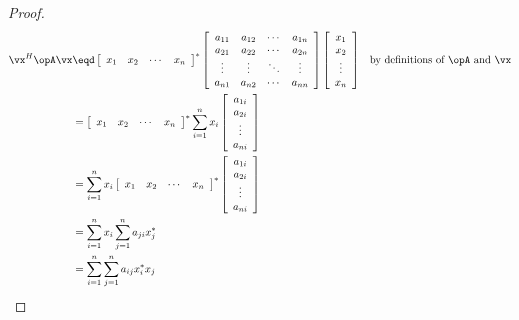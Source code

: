 \begin{lemma}
\label{lem:xAx}
\end{lemma}

\begin{proof}
\begin{align*}
   \vx ^H \opA \vx 
   &\eqd
   \left[ \begin{array}{ccccc} x_1 & x_2 & \cdots & x_n \end{array} \right]^\ast
   \left[\begin{array}{ccccc}
     a_{11}   & a_{12}   & \cdots & a_{1n}   \\
     a_{21}   & a_{22}   & \cdots & a_{2n}   \\
     \vdots   & \vdots   & \ddots & \vdots \\
     a_{n1}   & a_{n2}   & \cdots & a_{nn}
   \end{array}\right]
   \left[
      \begin{array}{ccccc}
         x_1 \\
         x_2 \\
         \vdots            \\
         x_n
      \end{array}
   \right]
  && \text{by definitions of $\opA$ and $\vx$}
\\&=
   \left[ \begin{array}{ccccc} x_1 & x_2 & \cdots & x_n \end{array} \right]^\ast
   \sum\limits_{i=1}^n
   x_i
   \left[
      \begin{array}{ccccc}
         a_{1i}   \\
         a_{2i}   \\
         \vdots   \\
         a_{ni}   \\
      \end{array}
   \right]
 \\&=
   \sum\limits_{i=1}^n
   x_i
   \left[ \begin{array}{ccccc} x_1 & x_2 & \cdots & x_n \end{array} \right]^\ast
   \left[
      \begin{array}{ccccc}
         a_{1i}   \\
         a_{2i}   \\
         \vdots   \\
         a_{ni}   \\
      \end{array}
   \right]
\\&=
   \sum\limits_{i=1}^n
   x_i
   \sum\limits_{j=1}^n a_{ji}x_j^\ast
\\&=
   \sum\limits_{i=1}^n
   \sum\limits_{j=1}^n a_{ij}x_i^\ast x_j
\end{align*}
\end{proof}


